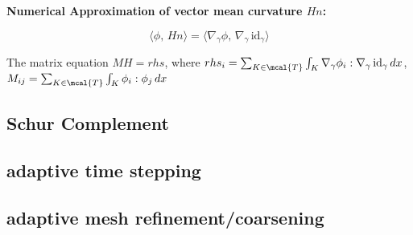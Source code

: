 \documentclass[10pt]{article}
\begin{document}
\begin{example}

{\bf Numerical Approximation of vector mean curvature $Hn$:}

\[\langle \phi, \, H n \rangle = \langle \nabla_\gamma \phi, \, \nabla_\gamma\,
\text{id}_\gamma \rangle \]

The matrix equation $MH = rhs$, where $rhs_{i} = \sum_{K \in \mcal{T}} \int_{K} \nabla_{\gamma}
\phi_i : \nabla_{\gamma}\, \text{id}_\gamma \,dx$, $M_{ij} = \sum_{K \in
   \mcal{T}} \int_{K} \phi_i : \phi_j \, dx$  
   
\end{example}

\subsection{Schur Complement}

\subsection{adaptive time stepping}

\subsection{adaptive mesh refinement/coarsening}







\end{document}
